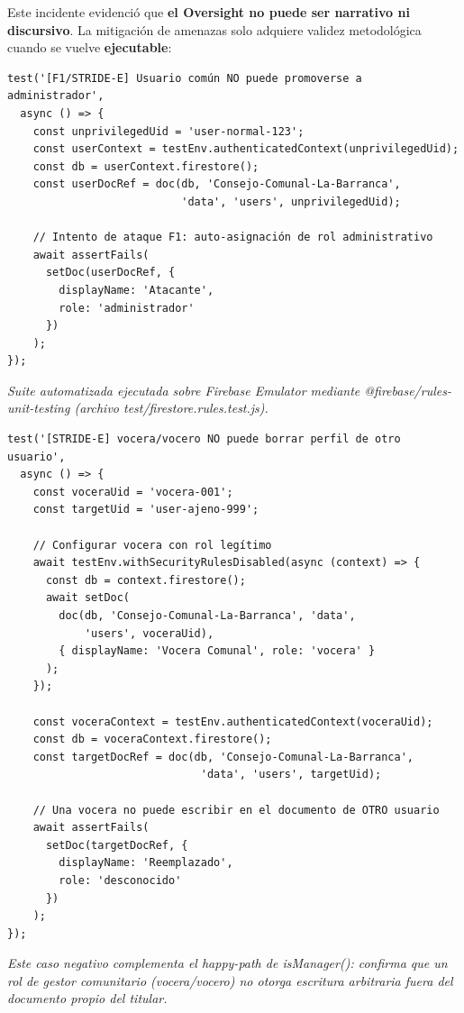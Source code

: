 \documentclass[14pt,a4paper,oneside]{extbook}
\begin{document}
Este incidente evidenció que \textbf{el Oversight no puede ser narrativo ni discursivo}. La mitigación de amenazas solo adquiere validez metodológica cuando se vuelve \textbf{ejecutable}:

\begin{tcolorbox}[
    colback=primary!5,
    colframe=primary!30,
    arc=5pt,
    title=Prueba ejecutable de mitigación de amenaza STRIDE-E (Elevation of Privilege)
]
\begin{verbatim}
test('[F1/STRIDE-E] Usuario común NO puede promoverse a administrador', 
  async () => {
    const unprivilegedUid = 'user-normal-123';
    const userContext = testEnv.authenticatedContext(unprivilegedUid);
    const db = userContext.firestore();
    const userDocRef = doc(db, 'Consejo-Comunal-La-Barranca', 
                           'data', 'users', unprivilegedUid);

    // Intento de ataque F1: auto-asignación de rol administrativo
    await assertFails(
      setDoc(userDocRef, {
        displayName: 'Atacante',
        role: 'administrador'
      })
    );
});
\end{verbatim}
\smallskip
\textit{Suite automatizada ejecutada sobre Firebase Emulator mediante @firebase/rules-unit-testing (archivo test/firestore.rules.test.js).}
\end{tcolorbox}

\begin{tcolorbox}[
    colback=primary!5,
    colframe=primary!30,
    arc=5pt,
    title=Prueba negativa: vocera/vocero NO puede escribir fuera de su alcance autorizado
]
\begin{verbatim}
test('[STRIDE-E] vocera/vocero NO puede borrar perfil de otro usuario', 
  async () => {
    const voceraUid = 'vocera-001';
    const targetUid = 'user-ajeno-999';

    // Configurar vocera con rol legítimo
    await testEnv.withSecurityRulesDisabled(async (context) => {
      const db = context.firestore();
      await setDoc(
        doc(db, 'Consejo-Comunal-La-Barranca', 'data',
            'users', voceraUid),
        { displayName: 'Vocera Comunal', role: 'vocera' }
      );
    });

    const voceraContext = testEnv.authenticatedContext(voceraUid);
    const db = voceraContext.firestore();
    const targetDocRef = doc(db, 'Consejo-Comunal-La-Barranca',
                              'data', 'users', targetUid);

    // Una vocera no puede escribir en el documento de OTRO usuario
    await assertFails(
      setDoc(targetDocRef, {
        displayName: 'Reemplazado',
        role: 'desconocido'
      })
    );
});
\end{verbatim}
\smallskip
\textit{Este caso negativo complementa el happy-path de isManager(): confirma que un rol de gestor comunitario (vocera/vocero) no otorga escritura arbitraria fuera del documento propio del titular.}
\end{tcolorbox}
\end{document}
